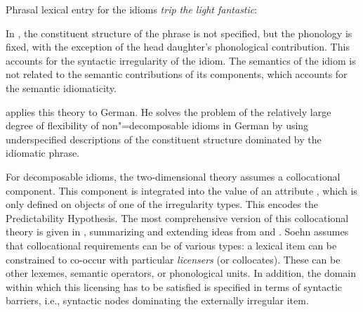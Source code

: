 \documentclass[output=paper]{langsci/langscibook}
\begin{document}
\ea Phrasal lexical entry for the idioms \emph{trip the light fantastic}:\label{rs-trip}\\
\z 

In , the constituent structure of the phrase is not specified, but the phonology is fixed, with the exception of the head daughter's phonological contribution. This accounts for the syntactic irregularity of the idiom. The semantics of the idiom is not related to the semantic contributions of its components, which accounts for the semantic idiomaticity.

\cite{Soehn2006a} applies this theory to German. He solves the problem of the relatively large degree of flexibility of non"=decomposable idioms in German
by using underspecified descriptions of the constituent structure dominated by the idiomatic phrase.

For decomposable idioms, the two-dimensional theory assumes a collocational component. This component is integrated into the value of an attribute , which is only defined on  objects of one of the irregularity types. 
This encodes the Predictability Hypothesis.
%
The most comprehensive version of this collocational theory is given in \cite{Soehn:09}, summarizing and extending ideas from \cite{Soehn2006a} and \cite{richter-soehn:2006}. 
Soehn assumes that collocational requirements can be of various types: 
a lexical item can be constrained to co-occur with particular \emph{licensers} (or collocates). These can be other lexemes, semantic operators, or phonological units. In addition, the domain within which this licensing has to be satisfied is specified in terms of syntactic barriers, i.e., syntactic nodes dominating the externally irregular item.
\end{document}
